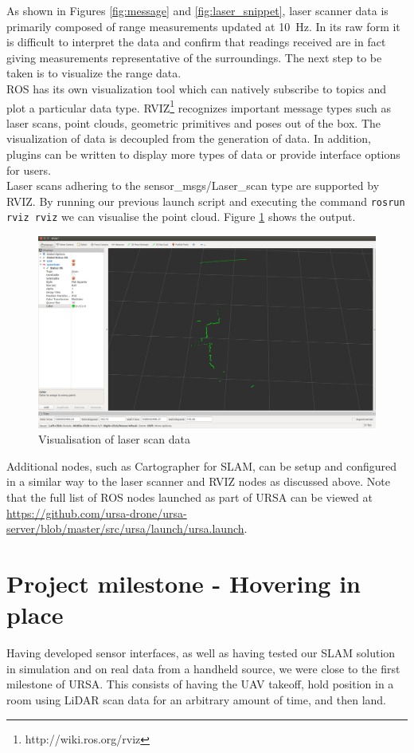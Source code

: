 \documentclass[capstone_report.tex]{subfiles}
\begin{document}
As shown in Figures \ref{fig:message} and \ref{fig:laser_snippet}, laser scanner data is primarily composed of range measurements updated at \SI{10}{\hertz}. In its raw form it is difficult to interpret the data and confirm that readings received are in fact giving measurements representative of the surroundings.  The next step to be taken is to visualize the range data.\\

ROS has its own visualization tool which can natively subscribe to topics and plot a particular data type.  RVIZ\footnote{http://wiki.ros.org/rviz} recognizes important message types such as laser scans, point clouds, geometric primitives and poses out of the box. The visualization of data is decoupled from the generation of data.  In addition, plugins can be written to display more types of data or provide interface options for users.\\

Laser scans adhering to the sensor\_msgs/Laser\_scan type are supported by RVIZ.  By running our previous launch script and executing the command \texttt{rosrun rviz rviz} we can visualise the point cloud.  Figure \ref{fig:RVIZ_laser} shows the output.

\begin{figure}[H]
    \centering
    \includegraphics[width=0.8\linewidth]{imgs/laser_scan_rviz.png}
    \caption{Visualisation of laser scan data}
    \label{fig:RVIZ_laser}
\end{figure}

Additional nodes, such as Cartographer for SLAM, can be setup and configured in a similar way to the laser scanner and RVIZ nodes as discussed above. Note that the full list of ROS nodes launched as part of URSA can be viewed at \url{https://github.com/ursa-drone/ursa-server/blob/master/src/ursa/launch/ursa.launch}.


\section{Project milestone - Hovering in place}
Having developed sensor interfaces, as well as having tested our SLAM solution in simulation and on real data from a handheld source, we were close to the first milestone of URSA. This consists of having the UAV takeoff, hold position in a room using LiDAR scan data for an arbitrary amount of time, and then land. \\
\end{document}
